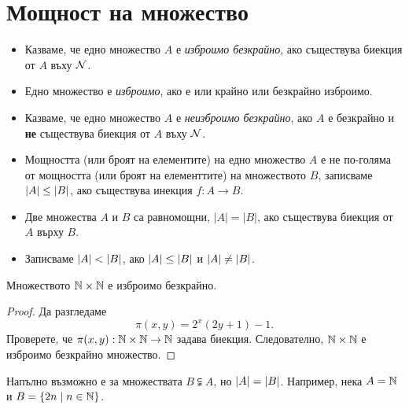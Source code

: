 \section*{Мощност на множество}

\begin{itemize}
\item 
  Казваме, че едно множество $A$ е {\em изброимо безкрайно}, ако съществува 
  биекция от $A$ въху $\mathcal{N}$.
\item
  Едно множество е {\em изброимо}, ако е или крайно или безкрайно изброимо.
\item
  Казваме, че едно множество $A$ е {\em неизброимо безкрайно}, ако $A$ е безкрайно и {\bf не} съществува 
  биекция от $A$ въху $\mathcal{N}$.
\item
  Мощността (или броят на елементите) на едно множество $A$ е не по-голяма от мощността (или броят на елементтите) на множеството $B$, 
  записваме $\lvert{A}\rvert \leq \lvert{B}\rvert$,
  ако съществува инекция $f:A \to B$.
\item
  Две множества $A$ и $B$ са равномощни, $|A| = |B|$, ако съществува биекция от $A$ върху $B$.
\item
  Записваме $\lvert{A}\rvert < \lvert{B}\rvert$, ако $\lvert{A}\rvert \leq \lvert{B}\rvert$ и $\lvert{A}\rvert \neq \lvert{B}\rvert$.
\end{itemize}

\begin{prop}
  Множеството $\mathbb{N}\times\mathbb{N}$ е изброимо безкрайно.
\end{prop}
\begin{proof}
  Да разгледаме
  \[\pi(x,y) = 2^x(2y+1)-1.\]
  Проверете, че $\pi(x,y):\mathbb{N}\times\mathbb{N}\to\mathbb{N}$ задава биекция.
  Следователно, $\mathbb{N}\times\mathbb{N}$ е изброимо безкрайно множество.
\end{proof}

\begin{remark}
  Напълно възможно е за множествата $B \subsetneqq A$, но $\lvert{A}\rvert = \lvert{B}\rvert$.
  Например, нека $A = \mathbb{N}$ и $B = \{2n\mid n\in\mathbb{N}\}$.
\end{remark}

